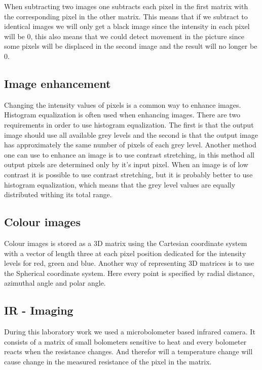When subtracting two images one subtracts each pixel in the first matrix with the corresponding pixel in the other matrix. %
This means that if we subtract to identical images we will only get a black image since the intensity in each pixel will be 0, this also means that we could detect movement in the picture since some pixels will be displaced in the second image and the result will no longer be 0.

\subsection{Image enhancement}
Changing the intensity values of pixels is a common way to enhance images. Histogram equalization is often used when enhancing images. There are two requirements in order to use histogram equalization. The first is that the output image should use all available grey levels and the second is that the output image has approximately the same number of pixels of each grey level. Another method one can use to enhance an image is to use contrast stretching, in this method all output pixels are determined only by it's input pixel. When an image is of low contrast it is possible to use contrast stretching, but it is probably better to use histogram equalization, which means that the grey level values are equally distributed withing its total range.


\subsection{Colour images}
Colour images is stored as a 3D matrix using the Cartesian coordinate system with a vector of length three at each pixel position dedicated for the intensity levels for red, green and blue. Another way of representing 3D matrices is to use the Spherical coordinate system. Here every point is specified by radial distance, azimuthal angle and polar angle.

\subsection{IR - Imaging}
During this laboratory work we used a microbolometer based infrared camera. It consists of a matrix of small bolometers sensitive to heat and every bolometer reacts when the resistance changes. And therefor will a temperature change will cause change in the measured resistance of the pixel in the matrix.